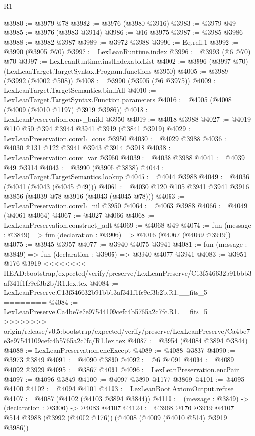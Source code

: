 \begin{lexlean}{R1}
\begin{coremodule}
{{{{{{{{{{{{{{{{{{{{{{{{{{{{{{{{{{{{{{{{{{{{{{{{{{{{{{{{{{{{{{{{{{{{{{{{{{{{{{{{{{{{{{{{{{{{{{{{{{{{{{{{{{{{{{{{{{{{{{{{{{{{{{{{{{{{{{{{{{{{{{{{{{{{{{{{{{{{{{{{{{{{{{{{{{{{{{{{{{{{{{{{{{@3980 := @3979 @78
@3982 := @3976 (@3980 @3916)
@3983 := @3979 @49
@3985 := @3976 (@3983 @3914)
@3986 := @16 @3975
@3987 := @3985 @3986
@3988 := @3982 @3987
@3989 := @3972 @3988
@3990 := Eq.refl.{1}
@3992 := @3990 (@3905 @70)
@3993 := LexLeanRuntime.index
@3996 := @3993 (@6 @70) @70
@3997 := LexLeanRuntime.instIndexableList
@4002 := @3996 (@3997 @70) (LexLeanTarget.TargetSyntax.Program.functions @3950)
@4005 := @3989 (@3992 (@4002 @508))
@4008 := @3990 (@3905 (@6 @3975))
@4009 := LexLeanTarget.TargetSemantics.bindAll
@4010 := LexLeanTarget.TargetSyntax.Function.parameters
@4016 := @4005 (@4008 (@4009 (@4010 @1197) @3919 @3986))
@4018 := LexLeanPreservation.conv_build @3950
@4019 := @4018 @3988
@4027 := @4019 @110 @50 @394 @3944 @3941 @3919 (@3841 @3919)
@4029 := LexLeanPreservation.convL_cons @3950
@4030 := @4029 @3988
@4036 := @4030 @131 @122 @3941 @3943 @3914 @3918
@4038 := LexLeanPreservation.conv_var @3950
@4039 := @4038 @3988
@4041 := @4039 @49 @3914
@4043 := @3990 (@3905 @3838)
@4044 := LexLeanTarget.TargetSemantics.lookup
@4045 := @4044 @3988
@4049 := @4036 (@4041 (@4043 (@4045 @49)))
@4061 := @4030 @120 @105 @3941 @3941 @3916 @3856 (@4039 @78 @3916 (@4043 (@4045 @78)))
@4063 := LexLeanPreservation.convL_nil @3950
@4064 := @4063 @3988
@4066 := @4049 (@4061 @4064)
@4067 := @4027 @4066
@4068 := LexLeanPreservation.construct_adt
@4069 := @4068 @49
@4074 := fun (message : @3849) => fun (declaration : @3906) => @4016 (@4067 (@4069 @3919))
@4075 := @3945 @3957
@4077 := @3940 @4075 @3941
@4081 := fun (message : @3849) => fun (declaration : @3906) => @3940 @4077 @3941
@4083 := @3951 @176 @3919
<<<<<<<< HEAD:bootstrap/expected/verify/preserve/LexLeanPreserve/C13f546632b91bbb3af341f1fc9cf3b2b/R1.lex.tex
@4084 := LexLeanPreserve.C13f546632b91bbb3af341f1fc9cf3b2b.R1.__fits_5
========
@4084 := LexLeanPreserve.Ca4be7e3e97544109cefc4b5765a2c7fc.R1.__fits_5
>>>>>>>> origin/release/v0.5:bootstrap/expected/verify/preserve/LexLeanPreserve/Ca4be7e3e97544109cefc4b5765a2c7fc/R1.lex.tex
@4087 := @3954 (@4084 @3894 @3844)
@4088 := LexLeanPreservation.encExcept
@4089 := @4088 @3837
@4090 := @3973 @3849
@4091 := @4090 @3890
@4092 := @6 @4091
@4094 := @4089 @4092 @3929
@4095 := @3867 @4091
@4096 := LexLeanPreservation.encPair
@4097 := @4096 @3849
@4100 := @4097 @3890 @1177 @3869
@4101 := @4095 @4100
@4102 := @4094 @4101
@4103 := LexLeanBoot.AxiomOutput.refuse
@4107 := @4087 (@4102 (@4103 @3894 @3844))
@4110 := (message : @3849) -> (declaration : @3906) -> @4083 @4107
@4124 := @3968
    @176
    @3919
    @4107
    @514
    @3988
    (@3992 (@4002 @176))
    (@4008 (@4009 (@4010 @514) @3919 @3986))
}}}}}}}}}}}}}}}}}}}}}}}}}}}}}}}}}}}}}}}}}}}}}}}}}}}}}}}}}}}}}}}}}}}}}}}}}}}}}}}}}}}}}}}}}}}}}}}}}}}}}}}}}}}}}}}}}}}}}}}}}}}}}}}}}}}}}}}}}}}}}}}}}}}}}}}}}}}}}}}}}}}}}}}}}}}}}}}}}}}}}}}}}}
\end{coremodule}
\end{lexlean}

